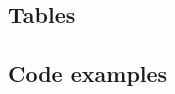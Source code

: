 \documentclass[a4paper, 12pt]{article}
\begin{document}






\subsection{Tables}




\subsection{Code examples}



\end{document}
